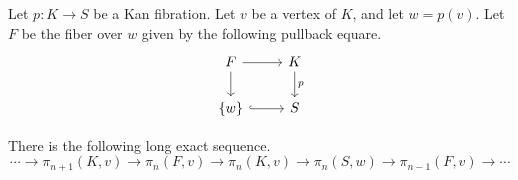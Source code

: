 \documentclass[main.tex]{subfiles}
\begin{document}
\begin{theorem}
  Let $p\colon K \to S$ be a Kan fibration. Let $v$ be a vertex of $K$, and let $w = p(v)$. Let $F$ be the fiber over $w$ given by the following pullback equare.
  \begin{equation*}
    \begin{tikzcd}
      F
      \arrow[r]
      \arrow[d]
      & K
      \arrow[d, "p"]
      \\
      \{w\}
      \arrow[r, hookrightarrow]
      & S
    \end{tikzcd}
  \end{equation*}

  There is the following long exact sequence.
  \begin{equation*}
    \cdots \longrightarrow \pi_{n+1}(K, v) \longrightarrow \pi_{n}(F, v) \longrightarrow \pi_{n}(K, v) \longrightarrow \pi_{n}(S, w) \longrightarrow \pi_{n-1}(F, v) \longrightarrow \cdots
  \end{equation*}
\end{theorem}
\end{document}
